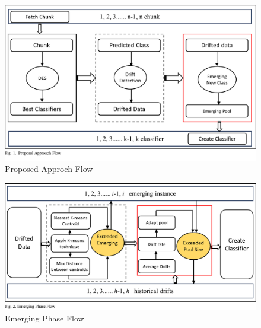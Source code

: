 \begin{figure}[!ht]
	\centering
	\includegraphics[width=1\linewidth]{5_Emerging/figures/algorithm1.png}
	\caption{Proposed Approch Flow}
	\label{fig:5_first_proposal_step_1}
\end{figure}
\begin{figure}[!ht]
	\centering
	\includegraphics[width=1\linewidth]{5_Emerging/figures/algorithm2.png}
	\caption{Emerging Phase Flow}
	\label{fig:5_first_proposal_step_2}
\end{figure}
